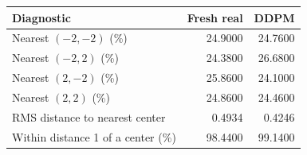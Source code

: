 \begin{tabular}{lrr}
\toprule
Diagnostic & Fresh real & DDPM\\
\midrule
Nearest $(-2,-2)$ (\%) & 24.9000 & 24.7600\\[1mm]
Nearest $(-2,2)$ (\%) & 24.3800 & 26.6800\\[1mm]
Nearest $(2,-2)$ (\%) & 25.8600 & 24.1000\\[1mm]
Nearest $(2,2)$ (\%) & 24.8600 & 24.4600\\[1mm]
RMS distance to nearest center & 0.4934 & 0.4246\\[1mm]
Within distance 1 of a center (\%) & 98.4400 & 99.1400\\[1mm]
\bottomrule
\end{tabular}
